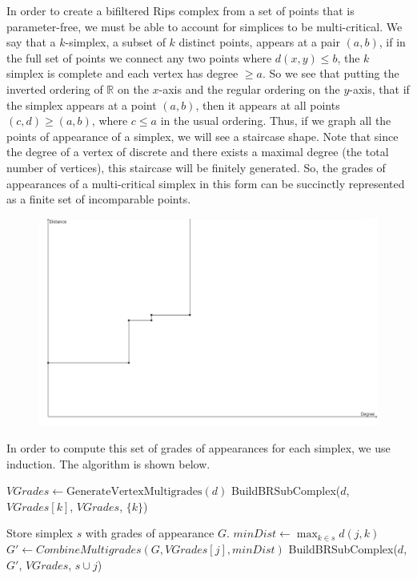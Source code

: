 \documentclass[12pt]{amsart}
\theoremstyle{definition}
\theoremstyle{remark}
\newcommand{\R}{\mathbb{R}}
\begin{document}
In order to create a bifiltered Rips complex from a set of points that is parameter-free, we must be able to account for simplices to be multi-critical. We say that a $k$-simplex, a subset of $k$ distinct points, appears at a pair $(a, b)$, if in the full set of points we connect any two points where $d(x, y) \le b$, the $k$ simplex is complete and each vertex has degree $\ge a$. So we see that putting the inverted ordering of $\R$ on the $x$-axis and the regular ordering on the $y$-axis, that if the simplex appears at a point $(a, b)$, then it appears at all points $(c, d) \ge (a, b)$, where $c \le a$ in the usual ordering. Thus, if we graph all the points of appearance of a simplex, we will see a staircase shape. Note that since the degree of a vertex of discrete and there exists a maximal degree (the total number of vertices), this staircase will be finitely generated. So, the grades of appearances of a multi-critical simplex in this form can be succinctly represented as a finite set of incomparable points.

\begin{figure}
	\centering
	\includegraphics[scale=0.25]{staircase.png}
\end{figure}

In order to compute this set of grades of appearances for each simplex, we use induction. The algorithm is shown below.

\begin{algorithmic}
		\State $VGrades \gets \text{GenerateVertexMultigrades}(d)$
			\State BuildBRSubComplex($d$, $VGrades[k]$, $VGrades$, $\{k\}$)
		\EndFor
	\EndFunction
	
		\State Store simplex $s$ with grades of appearance $G$.
			\State $minDist \gets \max_{k \in s} d(j, k)$
			\State $G' \gets CombineMultigrades(G, VGrades[j], minDist)$
			\State BuildBRSubComplex($d$, $G'$, $VGrades$, $s \cup {j}$)
		\EndFor
	\EndFunction	
\end{algorithmic}
\end{document}
